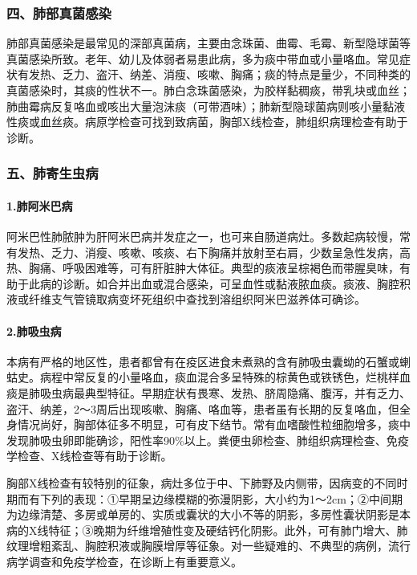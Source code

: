 \subsubsection{四、肺部真菌感染}

肺部真菌感染是最常见的深部真菌病，主要由念珠菌、曲霉、毛霉、新型隐球菌等真菌感染所致。老年、幼儿及体弱者易患此病，多为痰中带血或小量咯血。常见症状有发热、乏力、盗汗、纳差、消瘦、咳嗽、胸痛；痰的特点是量少，不同种类的真菌感染时，其痰的性状不一。肺白念珠菌感染，为胶样黏稠痰，带乳块或血丝；肺曲霉病反复咯血或咳出大量泡沫痰（可带酒味）；肺新型隐球菌病则咳小量黏液性痰或血丝痰。病原学检查可找到致病菌，胸部X线检查，肺组织病理检查有助于诊断。

\subsubsection{五、肺寄生虫病}

\paragraph{1.肺阿米巴病}

阿米巴性肺脓肿为肝阿米巴病并发症之一，也可来自肠道病灶。多数起病较慢，常有发热、乏力、消瘦、咳嗽、咳痰、右下胸痛并放射至右肩，少数呈急性发病，高热、胸痛、呼吸困难等，可有肝脏肿大体征。典型的痰液呈棕褐色而带腥臭味，有助于此病的诊断。如合并出血或混合感染，可呈血性或黏液脓血痰。痰液、胸腔积液或纤维支气管镜取病变坏死组织中查找到溶组织阿米巴滋养体可确诊。

\paragraph{2.肺吸虫病}

本病有严格的地区性，患者都曾有在疫区进食未煮熟的含有肺吸虫囊蚴的石蟹或蝲蛄史。病程中常反复的小量咯血，痰血混合多呈特殊的棕黄色或铁锈色，烂桃样血痰是肺吸虫病最典型特征。早期症状有畏寒、发热、脐周隐痛、腹泻，并有乏力、盗汗、纳差，2～3周后出现咳嗽、胸痛、咯血等，患者虽有长期的反复咯血，但全身情况尚好，胸部体征多不明显，可有皮下结节。常有血嗜酸性粒细胞增多，痰中发现肺吸虫卵即能确诊，阳性率90\%以上。粪便虫卵检查、肺组织病理检查、免疫学检查、X线检查等有助于诊断。

胸部X线检查有较特别的征象，病灶多位于中、下肺野及内侧带，因病变的不同时期而有下列的表现：①早期呈边缘模糊的弥漫阴影，大小约为1～2cm；②中间期为边缘清楚、多房或单房的、实质或囊状的大小不等的阴影，多房性囊状阴影是本病的X线特征；③晚期为纤维增殖性变及硬结钙化阴影。此外，可有肺门增大、肺纹理增粗紊乱、胸腔积液或胸膜增厚等征象。对一些疑难的、不典型的病例，流行病学调查和免疫学检查，在诊断上有重要意义。

